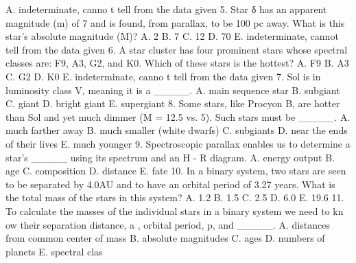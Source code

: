 A.
indeterminate, canno
t tell from the data given
5.
Star 
δ
has an apparent magnitude (m) of 7 and is found, from parallax, to be 100 pc away. 
What is this star’s absolute magnitude (M)?
A.
2
B.
7
C.
12
D.
70
E.
indeterminate, cannot tell from the data given
6.
A star cluster has four prominent stars whose spectral classes are: 
F9, A3, G2, and K0. Which 
of these stars is the hottest?
A.
F9
B.
A3
C.
G2
D.
K0
E.
indeterminate, canno
t tell from the data given
7.
Sol is in luminosity class V, meaning it is a _____.
A.
main sequence star
B.
subgiant 
C.
giant
D.
bright giant
E.
supergiant
8.
Some stars, like Procyon B, 
are hotter than Sol and yet much dimmer (M = 12.5 vs. 5). Such 
stars must be
_____.
A.
much farther away
B.
much smaller (white dwarfs)
C.
subgiants 
D.
near the ends of their lives
E.
much younger 
9.
Spectroscopic parallax 
enables us to determine a star’s _____ using its 
spectrum and an H
-
R 
diagram.
A.
energy output
B.
age
C.
composition
D.
distance
E.
fate 
10.
In a binary system, two stars are seen to be separated by 4.0AU and to have an orbital 
period of 3.27 years.  What is the 
total mass 
of the stars in this system?
A.
1.2
B.
1.5
C.
2.5
D.
6.0
E.
19.6
11.
To calculate the masses of the individual stars in a binary system we need to kn
ow their 
separation distance, a
, orbital period, p, and _____.
A.
distances from common center of mass
B.
absolute magnitudes
C.
ages
D.
numbers of planets
E.
spectral clas
